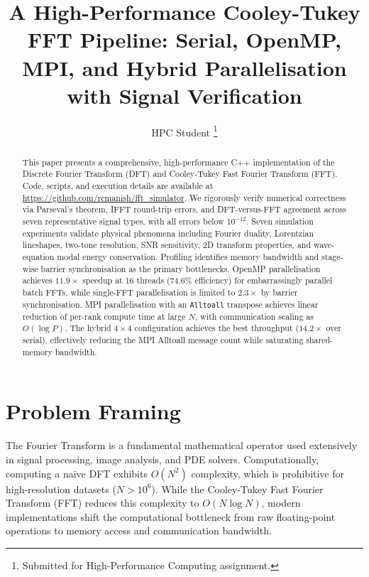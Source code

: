 \documentclass[journal]{IEEEtran}
\begin{document}
\title{A High-Performance Cooley-Tukey FFT Pipeline: Serial, OpenMP, MPI,
       and Hybrid Parallelisation with Signal Verification}
\author{HPC Student
\thanks{Submitted for High-Performance Computing assignment.}}

\maketitle

\begin{abstract}
This paper presents a comprehensive, high-performance C++ implementation of the Discrete Fourier Transform (DFT) and Cooley-Tukey Fast Fourier Transform (FFT). Code, scripts, and execution details are available at \url{https://github.com/rcmanish/fft_simulator}. We rigorously verify numerical correctness via Parseval's theorem, IFFT round-trip errors, and DFT-versus-FFT agreement across seven representative signal types, with all errors below $10^{-12}$. Seven simulation experiments validate physical phenomena including Fourier duality, Lorentzian lineshapes, two-tone resolution, SNR sensitivity, 2D transform properties, and wave-equation modal energy conservation. Profiling identifies memory bandwidth and stage-wise barrier synchronisation as the primary bottlenecks. OpenMP parallelisation achieves $11.9\times$ speedup at 16 threads (74.6\% efficiency) for embarrassingly parallel batch FFTs, while single-FFT parallelisation is limited to $2.3\times$ by barrier synchronisation. MPI parallelisation with an \texttt{Alltoall} transpose achieves linear reduction of per-rank compute time at large $N$, with communication scaling as $O(\log P)$. The hybrid $4{\times}4$ configuration achieves the best throughput ($14.2\times$ over serial), effectively reducing the MPI Alltoall message count while saturating shared-memory bandwidth.
\end{abstract}

\section{Problem Framing}
The Fourier Transform is a fundamental mathematical operator used extensively in signal processing, image analysis, and PDE solvers. Computationally, computing a naïve DFT exhibits $O(N^2)$ complexity, which is prohibitive for high-resolution datasets ($N > 10^6$). While the Cooley-Tukey Fast Fourier Transform (FFT) reduces this complexity to $O(N \log N)$, modern implementations shift the computational bottleneck from raw floating-point operations to memory access and communication bandwidth.
\end{document}
